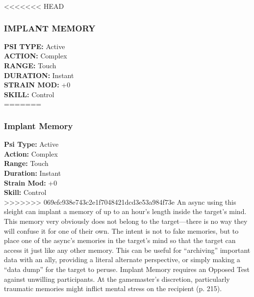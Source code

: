 <<<<<<< HEAD \subsubsection{IMPLANT MEMORY} \textbf{PSI TYPE:} Active \\ \textbf{ACTION:} Complex \\ \textbf{RANGE:} Touch \\ \textbf{DURATION:} Instant \\ \textbf{STRAIN MOD:} +0 \\ \textbf{SKILL:} Control\\ ======= \subsubsection{Implant Memory} \textbf{Psi Type:} Active \\ \textbf{Action:} Complex \\ \textbf{Range:} Touch \\ \textbf{Duration:} Instant \\ \textbf{Strain Mod:} +0 \\ \textbf{Skill:} Control\\ >>>>>>> 069efc938e743c2e1f7048421dcd3e53a984f73e An async using this sleight can implant a memory of up to an hour’s length inside the target’s mind. This memory very obviously does not belong to the target—there is no way they will confuse it for one of their own. The intent is not to fake memories, but to place one of the async’s memories in the target’s mind so that the target can access it just like any other memory. This can be useful for “archiving” important data with an ally, providing a literal alternate perspective, or simply making a “data dump” for the target to peruse. Implant Memory requires an Opposed Test against unwilling participants. At the gamemaster’s discretion, particularly traumatic memories might inflict mental stress on the recipient (p. 215). 

